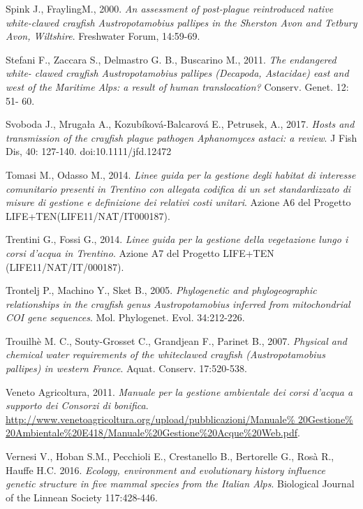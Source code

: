 \documentclass[11pt,a4paper,italian,twoside,openany]{memoir}
\begin{document}
\begin{thebibliography}{9}
 Spink J., FraylingM., 2000. \emph{An assessment of post-plague reintroduced native white-clawed crayfish Austropotamobius pallipes in the Sherston Avon and Tetbury Avon, Wiltshire}. Freshwater Forum, 14:59-69.

 Stefani F., Zaccara S., Delmastro G. B., Buscarino M., 2011. \emph{The endangered white- clawed crayfish Austropotamobius pallipes (Decapoda, Astacidae) east and west of the Maritime Alps: a result of human translocation?} Conserv. Genet. 12: 51- 60.

 Svoboda J., Mrugała A., Kozubíková-Balcarová E., Petrusek, A., 2017. \emph{Hosts and transmission of the crayfish plague pathogen Aphanomyces astaci: a review}. J Fish Dis, 40: 127-140. doi:10.1111/jfd.12472

 Tomasi M., Odasso M., 2014. \emph{Linee guida per la gestione degli habitat di interesse comunitario presenti in Trentino con allegata codifica di un set standardizzato di misure di gestione e definizione dei relativi costi unitari}. Azione A6 del Progetto LIFE+TEN(LIFE11/NAT/IT000187).

 Trentini G.,  Fossi G., 2014. \emph{Linee guida per la gestione della vegetazione lungo i corsi d'acqua in Trentino}. Azione A7 del Progetto LIFE+TEN (LIFE11/NAT/IT/000187).

 Trontelj P., Machino Y., Sket B., 2005. \emph{Phylogenetic and phylogeographic relationships in the crayfish genus Austropotamobius inferred from mitochondrial COI gene sequences}. Mol. Phylogenet. Evol. 34:212-226.

 Trouilhè M. C., Souty-Grosset C., Grandjean F., Parinet B., 2007. \emph{Physical and chemical water requirements of the whiteclawed crayfish (Austropotamobius pallipes) in western France}. Aquat. Conserv. 17:520-538. 

 Veneto Agricoltura, 2011. \emph{Manuale per la gestione ambientale dei corsi d'acqua a supporto dei Consorzi di bonifica}. \url{http://www.venetoagricoltura.org/upload/pubblicazioni/Manuale% 20Gestione% 20Ambientale%20E418/Manuale%20Gestione%20Acque%20Web.pdf}.

 Vernesi V., Hoban S.M., Pecchioli E., Crestanello B., Bertorelle G., Rosà R., Hauffe H.C. 2016. \emph{Ecology, environment and evolutionary history influence genetic structure in five mammal species from the Italian Alps}. Biological Journal of the Linnean Society 117:428-446. 


\end{thebibliography}
\end{document}
